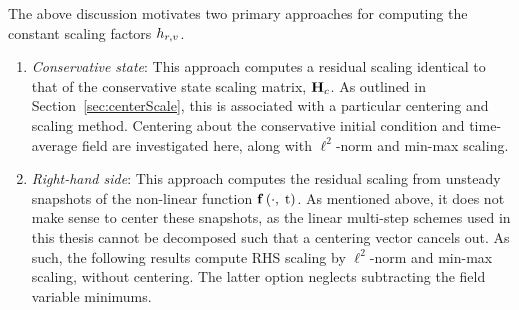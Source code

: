 The above discussion motivates two primary approaches for computing the constant scaling factors $h_{r,v}$. 
\begin{enumerate}
    \item \textit{Conservative state}: This approach computes a residual scaling identical to that of the conservative state scaling matrix, $\consScale$. As outlined in Section~\ref{sec:centerScale}, this is associated with a particular centering and scaling method. Centering about the conservative initial condition and time-average field are investigated here, along with $\ell^2$-norm and min-max scaling.
    \item \textit{Right-hand side}: This approach computes the residual scaling from unsteady snapshots of the non-linear function $\mathbf{f} \left(\cdot,\; \text{t}\right)$. As mentioned above, it does not make sense to center these snapshots, as the linear multi-step schemes used in this thesis cannot be decomposed such that a centering vector cancels out. As such, the following results compute RHS scaling by $\ell^2$-norm and min-max scaling, without centering. The latter option neglects subtracting the field variable minimums. 
\end{enumerate}

